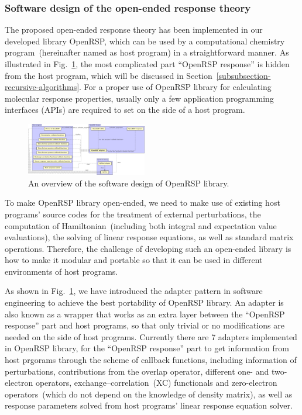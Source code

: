 \documentclass[%
 reprint,
 amsmath,amssymb,
 aps,
]{revtex4-1}
\begin{document}
\subsubsection{Software design of the open-ended response theory}

The proposed open-ended response theory has been implemented in our developed
library OpenRSP, which can be used by a computational chemistry
program~(hereinafter named as host program) in a straightforward manner. As
illustrated in Fig.~\ref{fig-openrsp-design}, the most complicated part
``OpenRSP response'' is hidden from the host program, which will be discussed
in Section~\ref{subsubsection-recursive-algorithms}. For a proper use of
OpenRSP library for calculating molecular response properties, usually only a
few application programming interfaces (APIs) are required to set on the side
of a host program.

\begin{figure}[hbt]
  \centering
  \includegraphics[width=0.47\textwidth]{openrsp_design.pdf}
  \caption{An overview of the software design of OpenRSP library.}
  \label{fig-openrsp-design}
\end{figure}

To make OpenRSP library open-ended, we need to make use of existing host
programs' source codes for the treatment of external perturbations, the
computation of Hamiltonian~(including both integral and expectation value
evaluations), the solving of linear response equations, as well as standard
matrix operations. Therefore, the challenge of developing such an open-ended
library is how to make it modular and portable so that it can be used in
different environments of host programs.

As shown in Fig.~\ref{fig-openrsp-design}, we have introduced the adapter
pattern in software engineering to achieve the best portability of OpenRSP
library. An adapter is also known as a wrapper that works as an extra layer
between the ``OpenRSP response'' part and host programs, so that only trivial
or no modifications are needed on the side of host programs.  Currently there
are 7 adapters implemented in OpenRSP library, for the ``OpenRSP response''
part to get information from host prgorams through the scheme of callback
functions, including information of perturbations, contributions from the
overlap operator, different one- and two-electron operators,
exchange--correlation~(XC) functionals and zero-electron operators~(which do
not depend on the knowledge of density matrix), as well as response parameters
solved from host programs' linear response equation solver.
\end{document}
